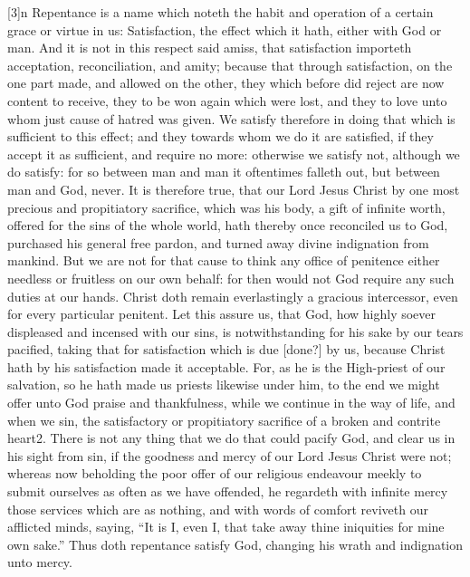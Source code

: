 [3]n Repentance is a name which noteth the habit and operation of a certain grace or virtue in us: Satisfaction, the effect which it hath, either with God or man. And it is not in this respect said amiss, that satisfaction importeth acceptation, reconciliation, and amity; because that through satisfaction, on the one part made, and allowed on the other, they which before did reject are now content to receive, they to be won again which were lost, and they to love unto whom just cause of hatred was given. We satisfy therefore in doing  that which is sufficient to this effect; and they towards whom we do it are satisfied, if they accept it as sufficient, and require no more: otherwise we satisfy not, although we do satisfy: for so between man and man it oftentimes falleth out, but between man and God, never. It is therefore true, that our Lord Jesus Christ by one most precious and propitiatory sacrifice, which was his body, a gift of infinite worth, offered for the sins of the whole world, hath thereby once reconciled us to God, purchased his general free pardon, and turned away divine indignation from mankind. But we are not for that cause to think any office of penitence either needless or fruitless on our own behalf: for then would not God require any such duties at our hands. Christ doth remain everlastingly a gracious intercessor, even for every particular penitent. Let this assure us, that God, how highly soever displeased and incensed with our sins, is notwithstanding for his sake by our tears pacified, taking that for satisfaction which is due [done?] by us, because Christ hath by his satisfaction made it acceptable. For, as he is the High-priest of our salvation, so he hath made us priests likewise under him, to the end we might offer unto God praise and thankfulness, while we continue in the way of life, and when we sin, the satisfactory or propitiatory sacrifice of a broken and contrite heart2. There is not any thing that we do that could pacify God, and clear us in his sight from sin, if the goodness and mercy of our Lord Jesus Christ were not; whereas now beholding the poor offer of our religious endeavour meekly to submit ourselves as often as we have offended, he regardeth with infinite mercy those services which are as nothing, and with words of comfort reviveth our afflicted minds, saying, “It is I, even I, that take away thine iniquities for mine own sake.” Thus doth repentance satisfy God, changing his wrath and indignation unto mercy.



